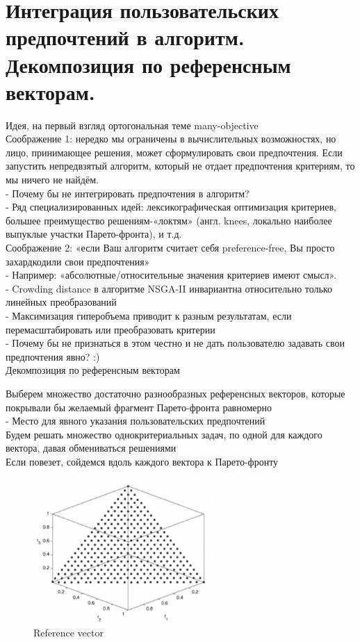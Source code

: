 \section{Интеграция пользовательских предпочтений в алгоритм. Декомпозиция по референсным векторам.}
Идея, на первый взгляд ортогональная теме many-objective\\
Соображение 1: нередко мы ограничены в вычислительных возможностях, но
лицо, принимающее решения, может сформулировать свои предпочтения. Если запустить непредвзятый алгоритм, который не отдает предпочтения критериям, то мы ничего не найдём.\\
- Почему бы не интегрировать предпочтения в алгоритм? \\
- Ряд специализированных идей: лексикографическая оптимизация критериев,
большее преимущество решениям-«локтям» (англ. knees, локально наиболее
выпуклые участки Парето-фронта), и т.д.\\
Соображение 2: «если Ваш алгоритм считает себя preference-free, Вы просто
захардкодили свои предпочтения»\\
- Например: «абсолютные/относительные значения критериев имеют смысл». \\
- Crowding distance в алгоритме NSGA-II инвариантна относительно только
линейных преобразований\\
- Максимизация гиперобъема приводит к разным результатам, если
перемасштабировать или преобразовать критерии\\
- Почему бы не признаться в этом честно и не дать пользователю задавать свои
предпочтения явно? :)\\

Декомпозиция по референсным векторам

Выберем множество достаточно разнообразных референсных векторов,
которые покрывали бы желаемый фрагмент Парето-фронта равномерно\\
- Место для явного указания пользовательских предпочтений\\
Будем решать множество однокритериальных задач, по одной для каждого
вектора, давая обмениваться решениями\\
Если повезет, сойдемся вдоль каждого вектора к Парето-фронту

\begin{figure}[!ht]

\begin{center}
    \includegraphics[width=0.3\linewidth]{images/Reference_vector.PNG}
    \caption{Reference vector}
    \label{fig:mpr}
    
\end{center}

\end{figure}

